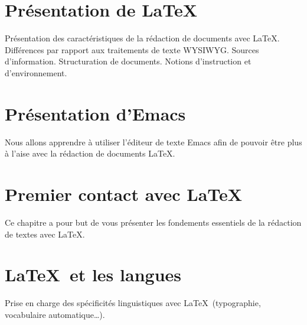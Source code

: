 
\chapter{Présentation de \LaTeX}
\begin{center}
\begin{minipage}[r]{0.5\linewidth}
  Présentation des caractéristiques de la rédaction de documents avec
  \LaTeX. Différences par rapport aux traitements de texte
  WYSIWYG. Sources d'information. Structuration de documents. Notions
  d'instruction et d'environnement.
  \end{minipage}
\end{center}





\chapter{Présentation d'Emacs}
\begin{center}
\begin{minipage}[r]{0.5\linewidth}
  Nous allons apprendre à utiliser l'éditeur de texte Emacs afin de
  pouvoir être plus à l'aise avec la rédaction de documents
  \LaTeX.
  \end{minipage}
\end{center}




\chapter{Premier contact avec \LaTeX}

\begin{center}
\begin{minipage}[r]{0.5\linewidth}
  Ce chapitre a pour but de vous présenter les fondements essentiels
  de la rédaction de textes avec \LaTeX.
  \end{minipage}
\end{center}




\chapter{\LaTeX\ et les langues}
\label{cha:babel}
\begin{center}
  \begin{minipage}[r]{0.5\linewidth}
    Prise en charge des spécificités linguistiques avec \LaTeX\
    (typographie, vocabulaire automatique\ldots).
  \end{minipage}
\end{center}

